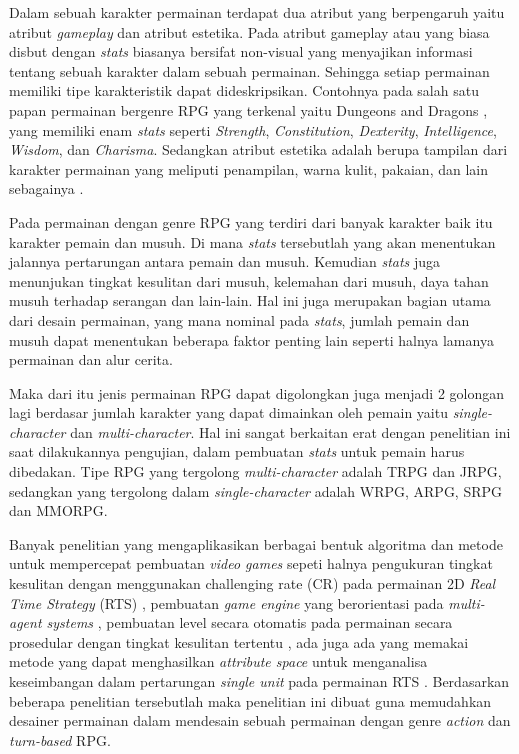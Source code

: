 Dalam sebuah karakter permainan terdapat dua atribut yang berpengaruh yaitu atribut \textit{gameplay} dan atribut estetika. Pada atribut gameplay atau yang biasa disbut dengan \textit{stats} biasanya bersifat non-visual yang menyajikan informasi tentang sebuah karakter dalam sebuah permainan. Sehingga setiap permainan memiliki tipe karakteristik dapat dideskripsikan. Contohnya pada salah satu papan permainan bergenre RPG yang terkenal yaitu Dungeons and Dragons \citep{heinsoo2008}, yang memiliki enam \textit{stats} seperti \textit{Strength}, \textit{Constitution}, \textit{Dexterity}, \textit{Intelligence}, \textit{Wisdom}, dan \textit{Charisma}. Sedangkan atribut estetika adalah berupa tampilan dari karakter permainan yang meliputi penampilan, warna kulit, pakaian, dan lain sebagainya \citep{camelo2014}.
\vspace{1ex}

Pada permainan dengan genre RPG yang terdiri dari banyak karakter baik itu karakter pemain dan musuh. Di mana \textit{stats} tersebutlah yang akan menentukan jalannya pertarungan antara pemain dan musuh. Kemudian \textit{stats} juga menunjukan tingkat kesulitan dari musuh, kelemahan dari musuh, daya tahan musuh terhadap serangan dan lain-lain. Hal ini juga merupakan bagian utama dari desain permainan, yang mana nominal pada \textit{stats}, jumlah pemain dan musuh dapat menentukan beberapa faktor penting lain seperti halnya lamanya permainan dan alur cerita. 
\vspace{1ex}

Maka dari itu jenis permainan RPG dapat digolongkan juga menjadi 2 golongan lagi berdasar jumlah karakter yang dapat dimainkan oleh pemain yaitu \textit{single-character} dan \textit{multi-character}. Hal ini sangat berkaitan erat dengan penelitian ini saat dilakukannya pengujian, dalam pembuatan \textit{stats} untuk pemain harus dibedakan. Tipe RPG yang tergolong \textit{multi-character} adalah TRPG dan JRPG, sedangkan yang tergolong dalam \textit{single-character} adalah WRPG, ARPG, SRPG dan MMORPG.
\vspace{1ex}

Banyak penelitian yang mengaplikasikan berbagai bentuk algoritma dan metode untuk mempercepat pembuatan \textit{video games} sepeti halnya pengukuran tingkat kesulitan dengan menggunakan challenging rate (CR) pada permainan 2D \textit{Real Time Strategy} (RTS) \citep{Christyowidiasmoro2016}, pembuatan \textit{game engine} yang berorientasi pada \textit{multi-agent systems} \citep{Marin-Lora2020}, pembuatan level secara otomatis pada permainan secara prosedular dengan tingkat kesulitan tertentu \citep{Wu2018}, ada juga ada yang memakai metode yang dapat menghasilkan \textit{attribute space} untuk menganalisa keseimbangan dalam pertarungan \textit{single unit} pada permainan RTS \citep{Bangay2014}. Berdasarkan beberapa penelitian tersebutlah maka penelitian ini dibuat guna memudahkan desainer permainan dalam mendesain sebuah permainan dengan genre \textit{action} dan \textit{turn-based} RPG.
\vspace{1ex}

